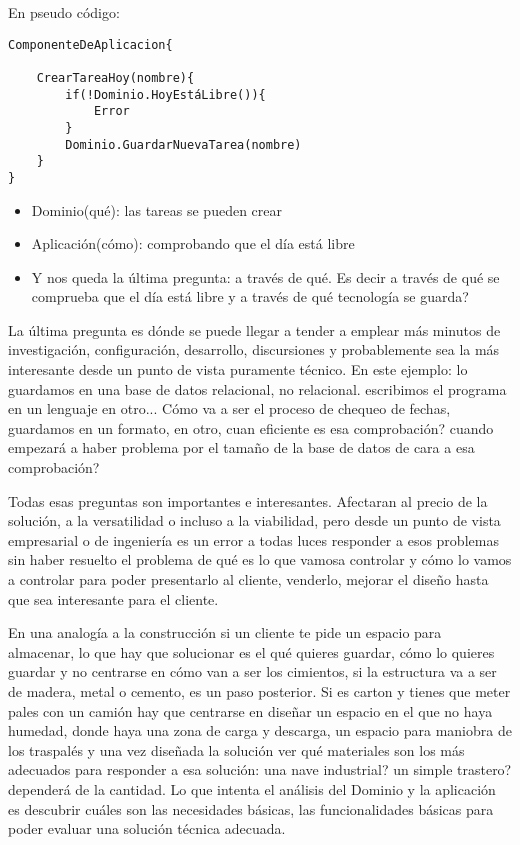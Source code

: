 En pseudo código:
\begin{verbatim}
ComponenteDeAplicacion{

    CrearTareaHoy(nombre){
        if(!Dominio.HoyEstáLibre()){
            Error
        }
        Dominio.GuardarNuevaTarea(nombre)
    }
}
\end{verbatim}

\begin{itemize}
    \item Dominio(qué): las tareas se pueden crear
    \item Aplicación(cómo): comprobando que el día está libre
    \item Y  nos queda la última pregunta: a través de qué. Es decir a través de qué se comprueba que el día está libre y a través de qué tecnología se guarda?
\end{itemize}

La última pregunta es dónde se puede llegar a tender a emplear más minutos de investigación, configuración, desarrollo, discursiones y probablemente sea la más interesante desde un punto de vista puramente técnico. En este ejemplo: lo guardamos en una base de datos relacional, no relacional. escribimos el programa en un lenguaje en otro... Cómo va a ser el proceso de chequeo de fechas, guardamos en un formato, en otro, cuan eficiente es esa comprobación? cuando empezará a haber problema por el tamaño de la base de datos de cara a esa comprobación?

Todas esas preguntas son importantes e interesantes. Afectaran al precio de la solución, a la versatilidad o incluso a la viabilidad, pero desde un punto de vista empresarial o de ingeniería es un error a todas luces responder a esos problemas sin haber resuelto el problema de qué es lo que vamosa controlar y cómo lo vamos a controlar para poder presentarlo al cliente, venderlo, mejorar el diseño hasta que sea interesante para el cliente.

En una analogía a la construcción si un cliente te pide un espacio para almacenar, lo que hay que solucionar es el qué quieres guardar, cómo lo quieres guardar y no centrarse en cómo van a ser los cimientos, si la estructura va a ser de madera, metal o cemento, es un paso posterior. Si es carton y tienes que meter pales con un camión hay que centrarse en diseñar un espacio en el que no haya humedad, donde haya una zona de carga y descarga, un espacio para maniobra de los traspalés y una vez diseñada la solución ver qué materiales son los más adecuados para responder a esa solución: una nave industrial? un simple trastero? dependerá de la cantidad. Lo que intenta el análisis del Dominio y la aplicación es descubrir cuáles son las necesidades básicas, las funcionalidades básicas para poder evaluar una solución técnica adecuada.

